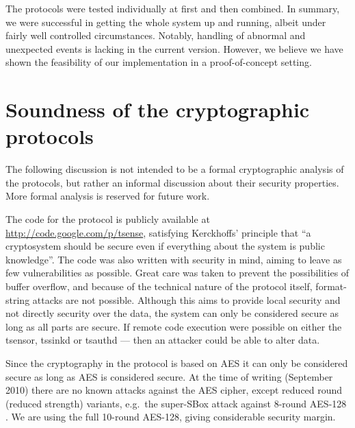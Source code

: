 The protocols were tested individually at first and then combined. In summary, we were successful in getting the whole system up and running, albeit under fairly well controlled circumstances. Notably, handling of abnormal and unexpected events is lacking in the current version. However, we believe we have shown the feasibility of our implementation in a proof-of-concept setting.

\section{Soundness of the cryptographic protocols}
\label{sec:crypto-protocol-analysis}

The following discussion is not intended to be a formal cryptographic analysis of the protocols, but rather an informal discussion about their security properties. More formal analysis is reserved for future work.

The code for the protocol is publicly available at \url{http://code.google.com/p/tsense}, satisfying Kerckhoffs' principle that ``a cryptosystem should be secure even if everything about the system is public knowledge''. The code was also written with security in mind, aiming to leave as few vulnerabilities as possible. Great care was taken to prevent the possibilities of buffer overflow, and because of the technical nature of the protocol itself, format-string attacks are not possible. Although this aims to provide local security and not directly security over the data, the system can only be considered secure as long as all parts are secure. If remote code execution were possible on either the tsensor, tssinkd or tsauthd --- then an attacker could be able to alter data. 

Since the cryptography in the protocol is based on AES it can only be considered secure as long as AES is considered secure. At the time of writing (September 2010) there are no known attacks against the AES cipher, except reduced round (reduced strength) variants, e.g.\ the super-SBox attack against 8-round AES-128 . We are using the full 10-round AES-128, giving considerable security margin. 

